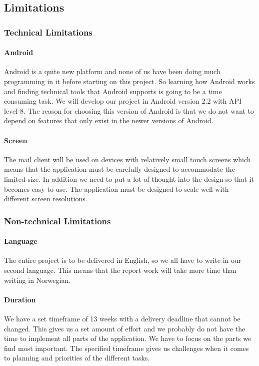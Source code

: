 \subsection{Limitations}

\subsubsection{Technical Limitations}

\paragraph{Android}
Android is a quite new platform and none of us have been doing much programming in it before starting on this project. So learning how Android works and finding technical tools that Android supports is going to be a time consuming task. We will develop our project in Android version 2.2 with API level 8. The reason for choosing this version of Android is that we do not want to depend on features that only exist in the newer versions of Android. 

\paragraph{Screen}
The mail client will be used on devices with relatively small touch screens which means that the application must be carefully designed to accommodate the limited size. In addition we need to put a lot of thought into the design so that it becomes easy to use. The application must be designed to scale well with different screen resolutions.

\subsubsection{Non-technical Limitations}

\paragraph{Language}
The entire project is to be delivered in English, so we all have to write in our second language. This means that the report work will take more time than writing in Norwegian. 

\paragraph{Duration}
We have a set timeframe of 13 weeks with a delivery deadline that cannot be changed. This gives us a set amount of effort and we probably do not have the time to implement all parts of the application. We have to focus on the parts we find most important. The specified timeframe gives us challenges when it comes to planning and priorities of the different tasks.